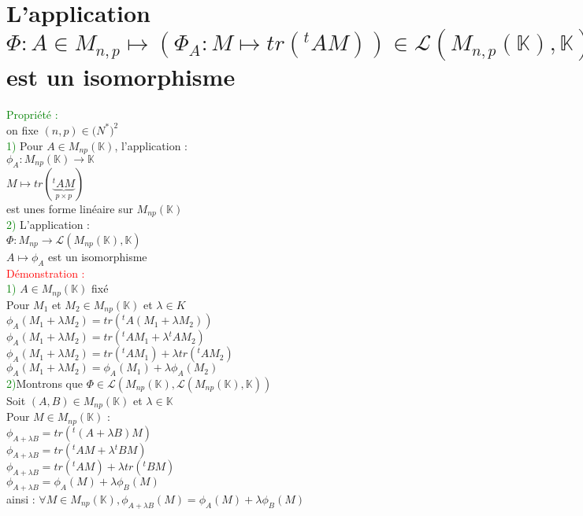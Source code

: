 \documentclass{article}
\begin{document}
	\section{L'application $\Phi : A \in M_{n,p} \longmapsto (\Phi_A : M \mapsto tr({}^tAM))\in \mathcal L(M_{n,p}(\mathbb K), \mathbb K)$ est un isomorphisme}
\textcolor{green}{Propriété :} \\
on fixe $(n,p) \in \mathbb (N^*)^2$ \\
\textcolor{green}{1)} Pour $A \in M_{np}(\mathbb K)$, l'application : \\
$\phi_A :M_{np}(\mathbb K) \rightarrow \mathbb K$ \\
$M \mapsto tr(\underbrace{{}^t AM}_{p \times p})$ \\
est unes forme linéaire sur $M_{np}(\mathbb K)$ \\
\textcolor{green}{2)} L'application : \\
$\Phi : M_{np} \rightarrow \mathcal L(M_{np}(\mathbb K), \mathbb K)$ \\
$A \mapsto \phi_A$ est un isomorphisme \\
\textcolor{red}{Démonstration :} \\
\textcolor{green}{1)} $A \in M_{np}( \mathbb K)$ fixé \\
Pour $M_1$ et $M_2 \in M_{np} (\mathbb K)$ et $\lambda \in K$ \\
$\phi_{A}(M_1+ \lambda M_2) = tr({}^tA (M_1 + \lambda M_2))$ \\
$\phi_{A}(M_1+ \lambda M_2) = tr({}^tAM_1 + \lambda {}^t AM_2)$ \\
$\phi_{A}(M_1+ \lambda M_2) = tr({}^tAM_1) + \lambda tr({}^t AM_2)$  \\
$\phi_{A}(M_1+ \lambda M_2) =\phi_A(M_1)+ \lambda \phi_A (M_2)$ \\
\textcolor{green}{2)}Montrons que { \boldmath $ \Phi \in  \mathcal L(M_{np}(\mathbb K),\mathcal L(M_{np}(\mathbb K), \mathbb K))$} \\
Soit $(A,B) \in M_{np}(\mathbb K)$ et $\lambda \in \mathbb K$ \\
Pour $M \in M_{np}(\mathbb K)$ : \\
$ \phi_{A+\lambda B}= tr ({}^t(A+ \lambda B)M)$ \\
$ \phi_{A+\lambda B}= tr ({}^tAM+ \lambda {}^tBM)$ \\
$\phi_{A+\lambda B}= tr ({}^tAM)+ \lambda tr({}^tBM) $ \\
$\phi_{A+\lambda B}= \phi_A (M) + \lambda \phi_B (M)$ \\
ainsi : $\forall M \in M_{np}(\mathbb K), \phi_{A + \lambda B}(M)= \phi_A (M) + \lambda \phi_B (M)$ \\
\end{document}
